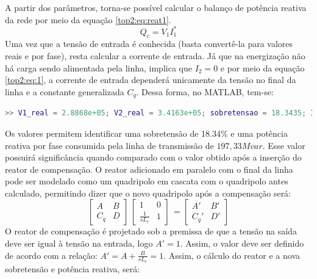 A partir dos parâmetros, torna-se possível calcular o balanço de potência reativa da rede por meio da equação \ref{top2:eq:reat1}.
\begin{equation} \label{top2:eq:reat1}
    Q_c = V_1I_1^* 
\end{equation}
Uma vez que a tensão de entrada é conhecida (basta convertê-la para valores reais e por fase), resta calcular a corrente de entrada. Já que na energização não há carga sendo alimentada pela linha, implica que $I_2=0$ e por meio da equação \ref{top2:eq:1}, a corrente de entrada dependerá unicamente da tensão no final da linha e a constante generalizada $C_q$. Dessa forma, no MATLAB, tem-se:



\begin{lstlisting}[language=Matlab,style=consolestyle]
>> V1_real = 2.8868e+05; V2_real = 3.4163e+05; sobretensao = 18.3435; I1_real = 6.8356e+02i; Qc =- 1.9733e+08i;
\end{lstlisting}


Os valores permitem identificar uma sobretensão de 18.34\% e uma potência reativa por fase consumida pela linha de transmissão de $197,33 Mvar$. Esse valor possuirá significância quando comparado com o valor obtido após a inserção do reator de compensação. O reator adicionado em paralelo com o final da linha pode ser modelado como um quadripolo em cascata com o quadripolo antes calculado, permitindo dizer que o novo quadripolo após a compensação será:
\begin{equation} \label{top2:eq:comp}
    \begin{bmatrix} A & B \\ C_q & D  \end{bmatrix}\,
    \begin{bmatrix} 1 & 0 \\ \frac{1}{sL_r} & 1  \end{bmatrix}\,
    = \begin{bmatrix} A' & B' \\ C_q' & D'  \end{bmatrix}
\end{equation}
O reator de compensação é projetado sob a premissa de que a tensão na saída deve ser igual à tensão na entrada, logo $A'=1$. Assim, o valor deve ser definido de acordo com a relação: $A' = A+\frac{B}{sL_r} = 1$. Assim, o cálculo do reator e a nova sobretensão e potência reativa, será:

